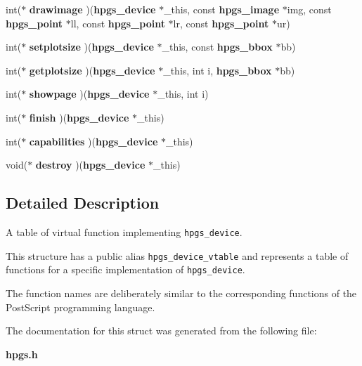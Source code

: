 \begin{CompactItemize}
\item 
int($\ast$ \textbf{drawimage} )({\bf hpgs\_\-device} $\ast$\_\-this, const {\bf hpgs\_\-image} $\ast$img, const {\bf hpgs\_\-point} $\ast$ll, const {\bf hpgs\_\-point} $\ast$lr, const {\bf hpgs\_\-point} $\ast$ur)\label{structhpgs__device__vtable__st_5dd8b6dfd8cc38201f337b1755a9f833}

\item 
int($\ast$ \textbf{setplotsize} )({\bf hpgs\_\-device} $\ast$\_\-this, const {\bf hpgs\_\-bbox} $\ast$bb)\label{structhpgs__device__vtable__st_731e06a06d4693c043b54148f6774d5a}

\item 
int($\ast$ \textbf{getplotsize} )({\bf hpgs\_\-device} $\ast$\_\-this, int i, {\bf hpgs\_\-bbox} $\ast$bb)\label{structhpgs__device__vtable__st_c62d3a20b9edaa607dde29a6851908ef}

\item 
int($\ast$ \textbf{showpage} )({\bf hpgs\_\-device} $\ast$\_\-this, int i)\label{structhpgs__device__vtable__st_ec74873ea699dfc85f6e829c9541692b}

\item 
int($\ast$ \textbf{finish} )({\bf hpgs\_\-device} $\ast$\_\-this)\label{structhpgs__device__vtable__st_0c06346b783d52d7eccf575ae7cda5bd}

\item 
int($\ast$ \textbf{capabilities} )({\bf hpgs\_\-device} $\ast$\_\-this)\label{structhpgs__device__vtable__st_2e5b01f48058722e3350a91c3d9468d3}

\item 
void($\ast$ \textbf{destroy} )({\bf hpgs\_\-device} $\ast$\_\-this)\label{structhpgs__device__vtable__st_499ef5eb1d26c04b87a701384a0c3292}

\end{CompactItemize}


\subsection{Detailed Description}
A table of virtual function implementing {\tt hpgs\_\-device}. 

This structure has a public alias {\tt hpgs\_\-device\_\-vtable} and represents a table of functions for a specific implementation of {\tt hpgs\_\-device}.

The function names are deliberately similar to the corresponding functions of the PostScript programming language. 

The documentation for this struct was generated from the following file:\begin{CompactItemize}
\item 
{\bf hpgs.h}\end{CompactItemize}
